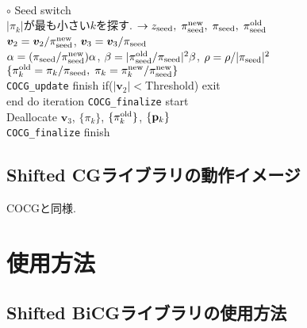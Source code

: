 \documentclass[12pt,titlepage]{jarticle}
\renewenvironment{leftbar}{%
  \def\FrameCommand{\vrule width 1pt \hspace{0pt}}%
  \MakeFramed {\advance\hsize-\width \FrameRestore}}%
 {\endMakeFramed}
\begin{document}
\begin{leftbar}
  \\\hspace{1.0cm}
  $\circ$ Seed switch
  \\\hspace{1.0cm}
  $|\pi_k|$が最も小さい$k$を探す. 
  $\rightarrow z_{\rm seed},\; \pi_{\rm seed}^{\rm new},\; \pi_{\rm seed},\; \pi_{\rm seed}^{\rm old} $
  \\\hspace{1.0cm}
  ${\boldsymbol v}_2 = {\boldsymbol v}_2 / \pi_{\rm seed}^{\rm new}$,
  ${\boldsymbol v}_3 = {\boldsymbol v}_3 / \pi_{\rm seed}$
  \\\hspace{1.0cm}
  $\alpha = (\pi_{\rm seed} / \pi_{\rm seed}^{\rm new}) \alpha$,
  $\beta = |\pi_{\rm seed}^{\rm old} / \pi_{\rm seed}|^2 \beta$,
  $\rho = \rho / |\pi_{\rm seed}|^2$
  \\\hspace{1.0cm}
  $\{\pi_k^{\rm old} = \pi_k / \pi_{\rm seed},\; \pi_k = \pi_k^{\rm new} / \pi_{\rm seed}^{\rm new}\}$
  \\\hspace{0.5cm}
  \verb|COCG_update| finish
\end{leftbar}
\vspace{-1em}
\noindent
\hspace{0.5cm}
if($|{\boldsymbol v}_2| < $Threshold) exit
\\
end do iteration
\vspace{-1em}
\begin{leftbar}
  \noindent
  \verb|COCG_finalize| start
  \\ \hspace{0.5cm}
  Deallocate ${\boldsymbol v}_3$, $\{\pi_k\}$, $\{\pi_k^{\rm old}\}$, $\{{\bf p}_k\}$
  \\
  \verb|COCG_finalize| finish
\end{leftbar}
\vspace{-1em}

\subsection{Shifted CGライブラリの動作イメージ}

COCGと同様.

\section{使用方法}

\subsection{Shifted BiCGライブラリの使用方法}
\end{document}
